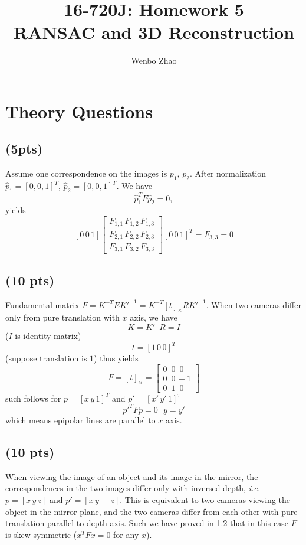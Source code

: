 \documentclass[12pt]{article}
\begin{document}
\title{16-720J: Homework 5\\RANSAC and 3D Reconstruction}

\author{Wenbo Zhao}

\maketitle

\vspace{-1cm}

\section{Theory Questions}

\subsection{(5pts)}
Assume one correspondence on the images is $p_1$, $p_2$. After normalization $\hat{p}_1 = [0,0,1]^T$, $\hat{p}_2 = [0,0,1]^T$. We have 
$$\hat{p}_1^T F \hat{p}_2=0,$$ yields
$$[0\, 0\, 1] \left [\begin{matrix} F_{1,1}\, F_{1,2}\, F_{1,3}\\ F_{2,1}\, F_{2,2}\, F_{2,3}\\ F_{3,1}\, F_{3,2}\, F_{3,3} \end{matrix} \right ][0\, 0\, 1]^T = F_{3,3} = 0$$

\subsection{(10 pts)}
\label{q:1.2}

Fundamental matrix $F=K^{-T}EK'^{-1}=K^{-T}[t]_{\times}RK'^{-1}$.
When two cameras differ only from pure translation with $x$ axis, we have
$$K=K'\,\,\,R=I$$($I$ is identity matrix)
$$t=[1\, 0\, 0]^T$$ (suppose translation is $1$)
thus yields
$$F=[t]_{\times}=\left [\begin{matrix} 0\,\,\, 0\,\,\, 0 \\ 0\,\,\, 0\, -1 \\ 0\,\,\, 1\,\,\, 0\end{matrix}\right ]$$
such follows for $p=[x\, y\, 1]^T$ and $p'=[x'\, y'\, 1]^\tau$
$$p'^TFp = 0\,\,\,\,y=y'$$
which means epipolar lines are parallel to $x$ axis.
\subsection{(10 pts)}
When viewing the image of an object and its image in the mirror, the correspondences in the two images differ only with inversed depth, \emph{i.e.} $p = [x\, y\, z]$ and $p'=[x\,y\,-z]$. This is equivalent to two cameras viewing the object in the mirror plane, and the two cameras differ from each other with pure translation parallel to depth axis. Such we have proved in \ref{q:1.2} that in this case $F$ is skew-symmetric ($x^TFx=0$ for any $x$).
\end{document}
